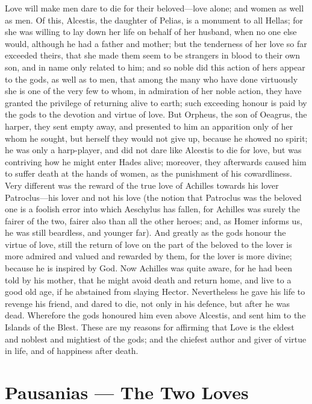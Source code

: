 \para[53] Love will make men dare to die for their beloved---love alone; and women as well as men. Of this, Alcestis, the daughter of Pelias, is a monument to all Hellas; for she was willing to lay down her life on behalf of her husband, when no one else would, although he had a father and mother; but the tenderness of her love so far exceeded theirs, that she made them seem to be strangers in blood to their own son, and in name only related to him; and so noble did this action of hers appear to the gods, as well as to men, that among the many who have done virtuously she is one of the very few to whom, in admiration of her noble action, they have granted the privilege of returning alive to earth; such exceeding honour is paid by the gods to the devotion and virtue of love. But Orpheus, the son of Oeagrus, the harper, they sent empty away, and presented to him an apparition only of her whom he sought, but herself they would not give up, because he showed no spirit; he was only a harp-player, and did not dare like Alcestis to die for love, but was contriving how he might enter Hades alive; moreover, they afterwards caused him to suffer death at the hands of women, as the punishment of his cowardliness. Very different was the reward of the true love of Achilles towards his lover Patroclus---his lover and not his love (the notion that Patroclus was the beloved one is a foolish error into which Aeschylus has fallen, for Achilles was surely the fairer of the two, fairer also than all the other heroes; and, as Homer informs us, he was still beardless, and younger far). And greatly as the gods honour the virtue of love, still the return of love on the part of the beloved to the lover is more admired and valued and rewarded by them, for the lover is more divine; because he is inspired by God. Now Achilles was quite aware, for he had been told by his mother, that he might avoid death and return home, and live to a good old age, if he abstained from slaying Hector. Nevertheless he gave his life to revenge his friend, and dared to die, not only in his defence, but after he was dead. Wherefore the gods honoured him even above Alcestis, and sent him to the Islands of the Blest. These are my reasons for affirming that Love is the eldest and noblest and mightiest of the gods; and the chiefest author and giver of virtue in life, and of happiness after death.

\section*{Pausanias — The Two Loves}

